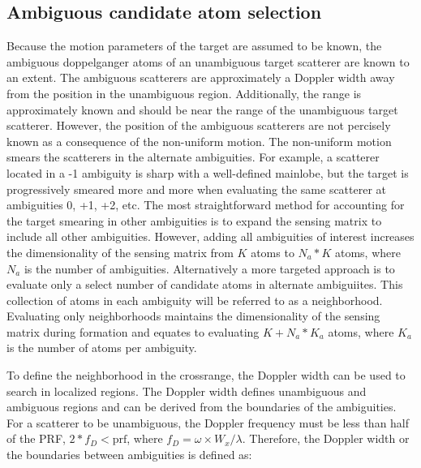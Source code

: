 \subsection{Ambiguous candidate atom selection}
\label{sec:atom_selection}


Because the motion parameters of the target are assumed to be known, the ambiguous doppelganger atoms of an unambiguous target scatterer are known to an extent. The ambiguous scatterers are approximately a Doppler width away from the position in the unambiguous region. Additionally, the range is approximately known and should be near the range of the unambiguous target scatterer. However, the position of the ambiguous scatterers are not percisely known as a consequence of the non-uniform motion. The non-uniform motion smears the scatterers in the alternate ambiguities. For example, a scatterer located in a -1 ambiguity is sharp with a well-defined mainlobe, but the target is progressively smeared more and more when evaluating the same scatterer at ambiguities 0, +1, +2, etc. The most straightforward method for accounting for the target smearing in other ambiguities is to expand the sensing matrix to include all other ambiguities. However, adding all ambiguities of interest increases the dimensionality of the sensing matrix from $K$ atoms to $N_{a}*K$ atoms, where $N_{a}$ is the number of ambiguities. Alternatively a more targeted approach is to evaluate only a select number of candidate atoms in alternate ambiguiites. This collection of atoms in each ambiguity will be referred to as a neighborhood. Evaluating only neighborhoods maintains the dimensionality of the sensing matrix during formation and equates to evaluating $K + N_{a}*K_{a}$ atoms, where $K_{a}$ is the number of atoms per ambiguity.

To define the neighborhood in the crossrange, the Doppler width can be used to search in localized regions. The Doppler width defines unambiguous and ambiguous regions and can be derived from the boundaries of the ambiguities. For a scatterer to be unambiguous, the Doppler frequency must be less than half of the PRF, $2*f_{D} < \text{prf}$, where $f_{D} = \omega \times W_{x} / \lambda$. Therefore, the Doppler width or the boundaries between ambiguities is defined as:

